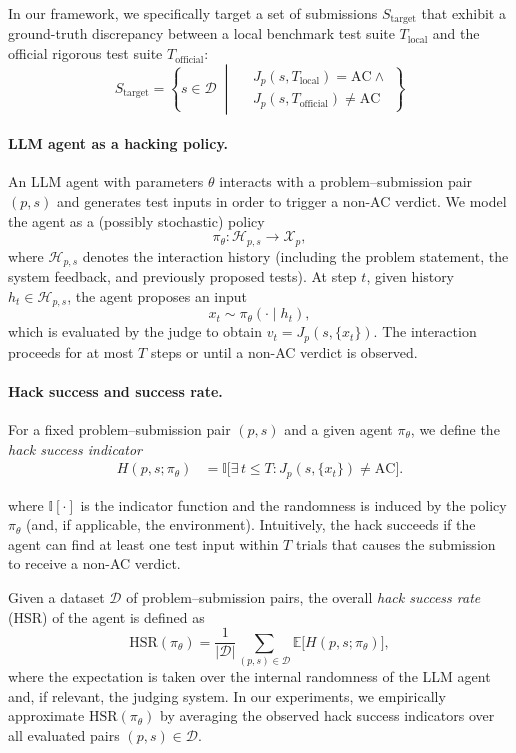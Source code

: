 \documentclass[11pt]{article}
\begin{document}
{In our framework, we specifically target a set of submissions $S_{\text{target}}$ that exhibit a ground-truth discrepancy between a local benchmark test suite $T_{\text{local}}$ and the official rigorous test suite $T_{\text{official}}$:}
\[
S_{\text{target}} = \left\{ s \in \mathcal{D} \;\middle|\; 
\begin{aligned}
& J_p(s, T_{\text{local}}) = \text{AC} \land {} \\
& J_p(s, T_{\text{official}}) \neq \text{AC}
\end{aligned} 
\right\}
\]

\paragraph{LLM agent as a hacking policy.}
An LLM agent with parameters $\theta$ interacts with a problem--submission pair $(p, s)$ and generates test inputs in order to trigger a non-AC verdict. We model the agent as a (possibly stochastic) policy
\[
\pi_\theta : \mathcal{H}_{p,s} \to \mathcal{X}_p,
\]
where $\mathcal{H}_{p,s}$ denotes the interaction history (including the problem statement, the system feedback, and previously proposed tests). At step $t$, given history $h_t \in \mathcal{H}_{p,s}$, the agent proposes an input
\[
x_t \sim \pi_\theta(\cdot \mid h_t),
\]
which is evaluated by the judge to obtain $v_t = J_p(s, \{x_t\})$. The interaction proceeds for at most $T$ steps or until a non-AC verdict is observed.

\paragraph{Hack success and success rate.}
For a fixed problem--submission pair $(p, s)$ and a given agent $\pi_\theta$, we define the \emph{hack success indicator}
\begin{align}
H(p,s;\pi_\theta)
&= \mathbb{I}\bigl[\exists\, t \le T : J_p(s,\{x_t\}) \neq \text{AC}\bigr].
\end{align}

where $\mathbb{I}[\cdot]$ is the indicator function and the randomness is induced by the policy $\pi_\theta$ (and, if applicable, the environment). Intuitively, the hack succeeds if the agent can find at least one test input within $T$ trials that causes the submission to receive a non-AC verdict.

Given a dataset $\mathcal{D}$ of problem--submission pairs, the overall \emph{hack success rate} (HSR) of the agent is defined as
\[
\mathrm{HSR}(\pi_\theta) 
= \frac{1}{|\mathcal{D}|} 
  \sum_{(p, s) \in \mathcal{D}} 
  \mathbb{E}\bigl[ H(p, s; \pi_\theta) \bigr],
\]
where the expectation is taken over the internal randomness of the LLM agent and, if relevant, the judging system. In our experiments, we empirically approximate $\mathrm{HSR}(\pi_\theta)$ by averaging the observed hack success indicators over all evaluated pairs $(p, s) \in \mathcal{D}$.
\end{document}
